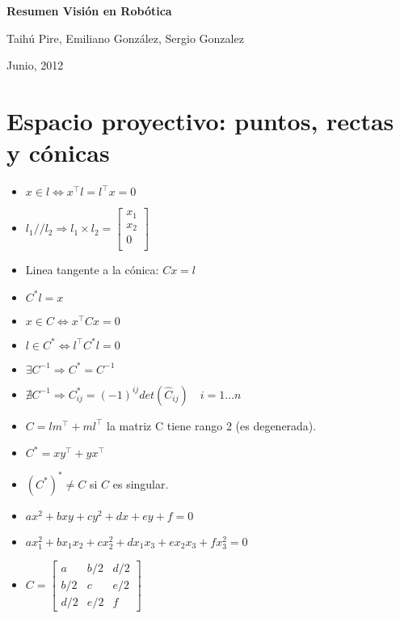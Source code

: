 \documentclass[12pt,a4paper]{article}
\begin{document}
\begin{center}
{\bf Resumen Visi\'on en Rob\'otica}

\medskip
Taih\'u Pire, Emiliano Gonz\'alez, Sergio Gonzalez

Junio, 2012
\end{center}


\setlength{\parindent}{0pt} %

\section{Espacio proyectivo: puntos, rectas y c\'onicas}

\begin{itemize}
	\item $x \in l \Leftrightarrow x^{\top}l = l^{\top} x = 0$

	\item $l_{1} // l_{2} \Rightarrow l_{1} \times l_{2} = \left[ {\begin{smallmatrix}
	 x_{1}\\
	 x_{2}\\
	 0\\
	\end{smallmatrix} } \right]
	$

	\item Linea tangente a la c\'onica: $C x = l$

	\item $C^{*} l = x$

	\item $x \in C \Leftrightarrow x^{\top} C x = 0$


	\item $l \in C^{*} \Leftrightarrow l^{\top} C^{*} l = 0$

	\item $ \exists C^{-1} \Rightarrow C^{*} = C^{-1}$

	\item $ \nexists C^{-1} \Rightarrow C_{ij}^{*} = (-1)^{ij} det(\hat{C}_{ij}) \quad i=1\dots n$

	\item $C = lm^{\top}+ml^{\top}$ la matriz C tiene rango 2 (es degenerada).

	\item $C^{*} = xy^{\top}+yx^{\top}$

	\item $(C^{*})^{*}  \neq C$ si $C$ es singular.

	\item $ax^{2}+bxy+cy^{2}+dx+ey+f = 0$

	\item $ax_{1}^{2}+bx_{1}x_{2}+cx_{2}^{2}+dx_{1}x_{3}+ex_{2}x_{3}+fx_{3}^{2} = 0$


	\item $
	C =
	\left[ {\begin{smallmatrix}
	 a & b/2 & d/2 \\
	 b/2 & c & e/2 \\
	 d/2 & e/2 & f
	\end{smallmatrix} } \right]
	$
\end{itemize}
\end{document}
